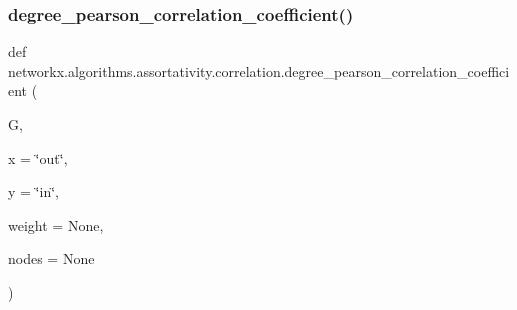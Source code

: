 \subsubsection{\texorpdfstring{degree\+\_\+pearson\+\_\+correlation\+\_\+coefficient()}{degree\_pearson\_correlation\_coefficient()}}
{\footnotesize\ttfamily def networkx.\+algorithms.\+assortativity.\+correlation.\+degree\+\_\+pearson\+\_\+correlation\+\_\+coefficient (\begin{DoxyParamCaption}\item[{}]{G,  }\item[{}]{x = {\ttfamily \char`\"{}out\char`\"{}},  }\item[{}]{y = {\ttfamily \char`\"{}in\char`\"{}},  }\item[{}]{weight = {\ttfamily None},  }\item[{}]{nodes = {\ttfamily None} }\end{DoxyParamCaption})}

